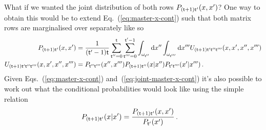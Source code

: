 \documentclass{book}
\begin{document}
What if we wanted the joint distribution of both rows $P_{({\sf t}+1){\sf t}'}(x,x')$? One way to obtain this would be to extend Eq.~(\ref{eq:master-x-cont}) such that both matrix rows are marginalised over separately like so
\begin{align}
P_{({\sf t}+1){\sf t}'}(x,x') &= \frac{1}{({\sf t}'-1){\sf t}}\sum_{{\sf t}''=0}^{{\sf t}}\sum_{{\sf t}'''=0}^{{\sf t}'-1}\int_{\omega_{{\sf t}''}}{\rm d}x''\int_{\omega_{{\sf t}'''}}{\rm d}x'''U_{({\sf t}+1){\sf t}'{\sf t}''{\sf t}'''}(x,x',x'',x''')  \label{eq:joint-master-x-cont} \\
U_{({\sf t}+1){\sf t}'{\sf t}''{\sf t}'''}(x,x',x'',x''') &= P_{{\sf t}''{\sf t}'''}(x'', x''') P_{({\sf t}+1){\sf t}''}(x\vert x'')P_{{\sf t}'{\sf t}'''}(x'\vert x''') \,.
\end{align}
Given Eqs.~(\ref{eq:master-x-cont}) and~(\ref{eq:joint-master-x-cont}) it's also possible to work out what the conditional probabilities would look like using the simple relation
\begin{align}
P_{({\sf t}+1){\sf t}'}(x\vert x') &= \frac{P_{({\sf t}+1){\sf t}'}(x,x')}{P_{{\sf t}'}(x')} \label{eq:cond-master-x-cont} \,.
\end{align}
\end{document}
